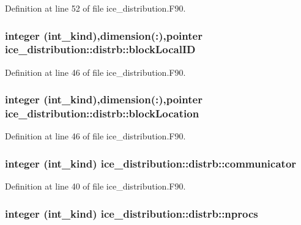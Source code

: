 Definition at line 52 of file ice\_\-distribution.F90.\hypertarget{typeice__distribution_1_1distrb_a407e3ec4f86d4118d4ba1fd491e0113c}{
\subsubsection[{blockLocalID}]{\setlength{\rightskip}{0pt plus 5cm}integer (int\_\-kind),dimension(:),pointer {\bf ice\_\-distribution::distrb::blockLocalID}}}
\label{typeice__distribution_1_1distrb_a407e3ec4f86d4118d4ba1fd491e0113c}


Definition at line 46 of file ice\_\-distribution.F90.\hypertarget{typeice__distribution_1_1distrb_ab2bb142e943e3f626068050abcba030f}{
\subsubsection[{blockLocation}]{\setlength{\rightskip}{0pt plus 5cm}integer (int\_\-kind),dimension(:),pointer {\bf ice\_\-distribution::distrb::blockLocation}}}
\label{typeice__distribution_1_1distrb_ab2bb142e943e3f626068050abcba030f}


Definition at line 46 of file ice\_\-distribution.F90.\hypertarget{typeice__distribution_1_1distrb_a3186ecdfee930115046bc3e5bc3769f4}{
\subsubsection[{communicator}]{\setlength{\rightskip}{0pt plus 5cm}integer (int\_\-kind) {\bf ice\_\-distribution::distrb::communicator}}}
\label{typeice__distribution_1_1distrb_a3186ecdfee930115046bc3e5bc3769f4}


Definition at line 40 of file ice\_\-distribution.F90.\hypertarget{typeice__distribution_1_1distrb_a31fd7407975e1cc030ff11a0fb6d93f4}{
\subsubsection[{nprocs}]{\setlength{\rightskip}{0pt plus 5cm}integer (int\_\-kind) {\bf ice\_\-distribution::distrb::nprocs}}}
\label{typeice__distribution_1_1distrb_a31fd7407975e1cc030ff11a0fb6d93f4}


